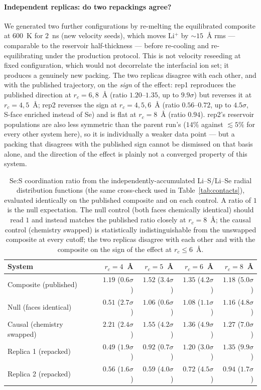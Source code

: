 \documentclass[review, 12pt]{elsarticle}
\numberwithin{equation}{section}
\newcommand{\Tab}[1] {Table~\ref{#1}}
\begin{document}
\paragraph{Independent replicas: do two repackings agree?} We generated two further configurations by re-melting the equilibrated composite at $600$~K for $2$~ns (new velocity seeds), which moves Li$^+$ by $\sim15$~\AA$ $ rms --- comparable to the reservoir half-thickness --- before re-cooling and re-equilibrating under the production protocol. This is not velocity reseeding at fixed configuration, which would not decorrelate the interfacial ion set; it produces a genuinely new packing. The two replicas disagree with each other, and with the published trajectory, on the \emph{sign} of the effect: rep1 reproduces the published direction at $r_c=6,8$~\AA{} (ratio $1.20$--$1.35$, up to $9.9\sigma$) but reverses it at $r_c=4,5$~\AA{}; rep2 reverses the sign at $r_c=4,5,6$~\AA{} (ratio $0.56$--$0.72$, up to $4.5\sigma$, S-face enriched instead of Se) and is flat at $r_c=8$~\AA{} (ratio $0.94$). rep2's reservoir populations are also less symmetric than the parent run's ($14\%$ against $\lesssim5\%$ for every other system here), so it is individually a weaker data point --- but a packing that disagrees with the published sign cannot be dismissed on that basis alone, and the direction of the effect is plainly not a converged property of this system.

\begin{table}[H]
\caption{Se:S coordination ratio from the independently-accumulated Li--S/Li--Se radial distribution functions (the same cross-check used in \Tab{tab:contacts}), evaluated identically on the published composite and on each control. A ratio of $1$ is the null expectation. The null control (both faces chemically identical) should read $1$ and instead matches the published ratio closely at $r_c=8$~\AA; the causal control (chemistry swapped) is statistically indistinguishable from the unswapped composite at every cutoff; the two replicas disagree with each other and with the composite on the sign of the effect at $r_c\le6$~\AA.}
\label{tab:controls}
\centering
\begin{tabular}{lrrrr}
\hline
System & $r_c=4$~\AA & $r_c=5$~\AA & $r_c=6$~\AA & $r_c=8$~\AA \\
\hline
Composite (published) & $1.19$ ($0.6\sigma$) & $1.52$ ($3.4\sigma$) & $1.35$ ($4.2\sigma$) & $1.18$ ($5.0\sigma$) \\
Null (faces identical) & $0.51$ ($2.7\sigma$) & $1.06$ ($0.6\sigma$) & $1.08$ ($1.1\sigma$) & $1.16$ ($4.8\sigma$) \\
Causal (chemistry swapped) & $2.21$ ($2.4\sigma$) & $1.55$ ($4.2\sigma$) & $1.36$ ($4.9\sigma$) & $1.27$ ($7.0\sigma$) \\
Replica 1 (repacked) & $0.49$ ($1.9\sigma$) & $0.92$ ($0.7\sigma$) & $1.20$ ($3.0\sigma$) & $1.35$ ($9.9\sigma$) \\
Replica 2 (repacked) & $0.56$ ($1.6\sigma$) & $0.59$ ($4.0\sigma$) & $0.72$ ($4.5\sigma$) & $0.94$ ($1.7\sigma$) \\
\hline
\end{tabular}
\end{table}
\end{document}
